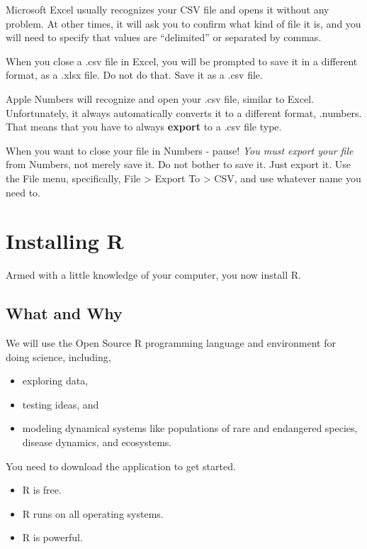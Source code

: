 \documentclass[
  letterpaper,
  DIV=11,
  numbers=noendperiod]{scrreprt}
\providecommand{\tightlist}{%
  \setlength{\itemsep}{0pt}\setlength{\parskip}{0pt}}
\begin{document}
Microsoft Excel usually recognizes your CSV file and opens it without
any problem. At other times, it will ask you to confirm what kind of
file it is, and you will need to specify that values are ``delimited''
or separated by commas.

When you close a .csv file in Excel, you will be prompted to save it in
a different format, as a .xlsx file. Do not do that. Save it as a .csv
file.

Apple Numbers will recognize and open your .csv file, similar to Excel.
Unfortunately, it always automatically converts it to a different
format, .numbers. That means that you have to always \textbf{export} to
a .csv file type.

When you want to close your file in Numbers - pause! \emph{You must
export your file} from Numbers, not merely save it. Do not bother to
save it. Just export it. Use the File menu, specifically, File
\textgreater{} Export To \textgreater{} CSV, and use whatever name you
need to.

\section{Installing R}\label{installing-r}

Armed with a little knowledge of your computer, you now install R.

\subsection{What and Why}\label{what-and-why}

We will use the Open Source R programming language and environment for
doing science, including,

\begin{itemize}
\tightlist
\item
  exploring data,
\item
  testing ideas, and
\item
  modeling dynamical systems like populations of rare and endangered
  species, disease dynamics, and ecosystems.
\end{itemize}

You need to download the application to get started.

\begin{itemize}
\tightlist
\item
  R is free.
\item
  R runs on all operating systems.
\item
  R is powerful.
\end{itemize}
\end{document}
